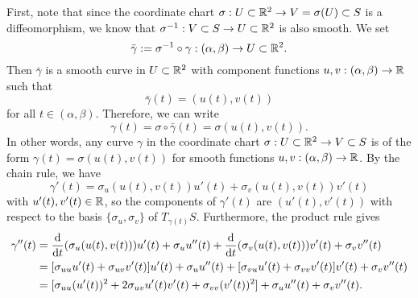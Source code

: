 First, note that since the coordinate chart $\sigma : U \subset \mathbb{R}^2 
\to V = \sigma(U) \subset S$ is a diffeomorphism, we know that 
$\sigma^{-1} : V \subset S \to U \subset \mathbb{R}^2$ is also smooth. We set 
\[ \bar\gamma := \sigma^{-1} \circ \gamma : (\alpha, \beta) \to U \subset \mathbb{R}^2. \] 
Then $\bar\gamma$ is a smooth curve in $U \subset \mathbb{R}^2$ with component functions 
$u, v : (\alpha, \beta) \to \mathbb{R}$ such that 
\[ \bar\gamma(t) = (u(t), v(t)) \] 
for all $t \in (\alpha, \beta)$. Therefore, we can write 
\[ \gamma(t) = \sigma \circ \bar\gamma(t) = \sigma(u(t), v(t)). \] 
In other words, any curve $\gamma$ in the coordinate chart $\sigma : 
U \subset \mathbb{R}^2 \to V \subset S$ is of the form $\gamma(t) = \sigma(u(t), v(t))$ 
for smooth functions $u, v : (\alpha, \beta) \to \mathbb{R}$. By the chain rule, we have 
\[ \gamma'(t) = \sigma_u(u(t), v(t)) u'(t) + \sigma_v(u(t), v(t)) v'(t) \] 
with $u'(t), v'(t) \in \mathbb{R}$, so the components of $\gamma'(t)$ are 
$(u'(t), v'(t))$ with respect to the basis $\{\sigma_u, \sigma_v\}$ of 
$T_{\gamma(t)}S$. Furthermore, the product rule gives 
\begin{align*}
    \gamma''(t) 
    &= \frac{{\rm d}}{{\rm d}t} (\sigma_u(u(t), v(t))) u'(t) + \sigma_u u''(t) 
    + \frac{{\rm d}}{{\rm d}t}(\sigma_v(u(t), v(t))) v'(t) + \sigma_v v''(t) \\ 
    &= [\sigma_{uu} u'(t) + \sigma_{uv} v'(t)] u'(t) + \sigma_u u''(t) 
    + [\sigma_{vu} u'(t) + \sigma_{vv} v'(t)] v'(t) + \sigma_v v''(t) \\ 
    &= [\sigma_{uu} (u'(t))^2 + 2\sigma_{uv} u'(t) v'(t) + \sigma_{vv} (v'(t))^2]
    + \sigma_u u''(t) + \sigma_v v''(t). 
\end{align*}

